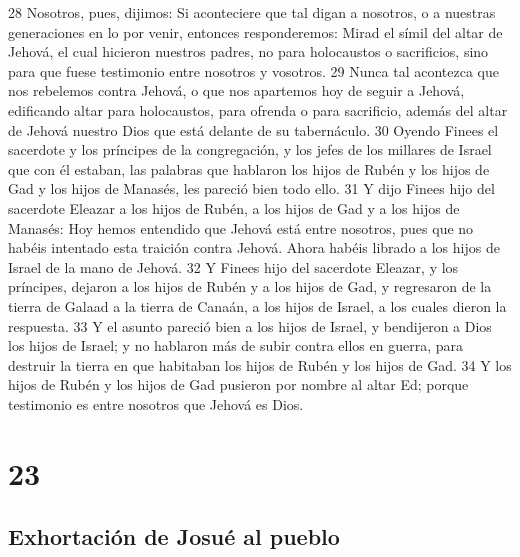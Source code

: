 28 Nosotros, pues, dijimos: Si aconteciere que tal digan a nosotros, o a nuestras generaciones en lo por venir, entonces responderemos: Mirad el símil del altar de Jehová, el cual hicieron nuestros padres, no para holocaustos o sacrificios, sino para que fuese testimonio entre nosotros y vosotros.
29 Nunca tal acontezca que nos rebelemos contra Jehová, o que nos apartemos hoy de seguir a Jehová, edificando altar para holocaustos, para ofrenda o para sacrificio, además del altar de Jehová nuestro Dios que está delante de su tabernáculo.
30 Oyendo Finees el sacerdote y los príncipes de la congregación, y los jefes de los millares de Israel que con él estaban, las palabras que hablaron los hijos de Rubén y los hijos de Gad y los hijos de Manasés, les pareció bien todo ello.
31 Y dijo Finees hijo del sacerdote Eleazar a los hijos de Rubén, a los hijos de Gad y a los hijos de Manasés: Hoy hemos entendido que Jehová está entre nosotros, pues que no habéis intentado esta traición contra Jehová. Ahora habéis librado a los hijos de Israel de la mano de Jehová.
32 Y Finees hijo del sacerdote Eleazar, y los príncipes, dejaron a los hijos de Rubén y a los hijos de Gad, y regresaron de la tierra de Galaad a la tierra de Canaán, a los hijos de Israel, a los cuales dieron la respuesta.
33 Y el asunto pareció bien a los hijos de Israel, y bendijeron a Dios los hijos de Israel; y no hablaron más de subir contra ellos en guerra, para destruir la tierra en que habitaban los hijos de Rubén y los hijos de Gad.
34 Y los hijos de Rubén y los hijos de Gad pusieron por nombre al altar Ed; porque testimonio es entre nosotros que Jehová es Dios.

\chapter{23}

\section*{Exhortación de Josué al pueblo}

